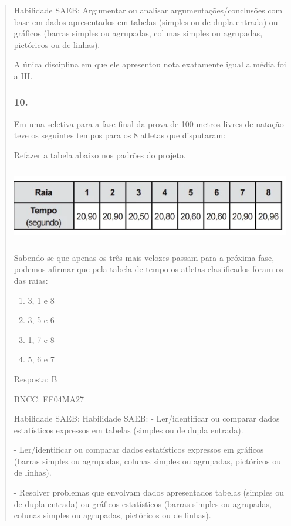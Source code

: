 \begin{enumerate}
\begin{escolha}
\begin{enumerate}
\begin{itemize}
\begin{itemize}
\begin{escolha}
\begin{quote}
\begin{escolha}
{Habilidade SAEB: Argumentar ou analisar argumentações/conclusões com
base em dados apresentados em tabelas (simples ou de dupla entrada) ou
gráficos (barras simples ou agrupadas, colunas simples ou agrupadas,
pictóricos ou de linhas).

A única disciplina em que ele apresentou nota exatamente igual a média
foi a III.

\subsubsection{10.}\label{section-181}

Em uma seletiva para a fase final da prova de 100 metros livres de
natação teve os seguintes tempos para os 8 atletas que disputaram:

Refazer a tabela abaixo nos padrões do projeto.

\includegraphics[width=5.90556in,height=1.27708in]{media/image161.png}

Sabendo-se que apenas os três mais velozes passam para a próxima fase,
podemos afirmar que pela tabela de tempo os atletas clasiificados foram
os das raias:

\begin{enumerate}
\def\labelenumi{\alph{enumi})}
\item
  3, 1 e 8
\item
  3, 5 e 6
\item
  1, 7 e 8
\item
  5, 6 e 7
\end{enumerate}

Resposta: B

BNCC: EF04MA27

Habilidade SAEB: Habilidade SAEB: - Ler/identificar ou comparar dados
estatísticos expressos em tabelas (simples ou de dupla entrada).

- Ler/identificar ou comparar dados estatísticos expressos em gráficos
(barras simples ou agrupadas, colunas simples ou agrupadas, pictóricos
ou de linhas).

- Resolver problemas que envolvam dados apresentados tabelas (simples ou
de dupla entrada) ou gráficos estatísticos (barras simples ou agrupadas,
colunas simples ou agrupadas, pictóricos ou de linhas).

}
\end{escolha}
\end{quote}
\end{escolha}
\end{itemize}
\end{itemize}
\end{enumerate}
\end{escolha}
\end{enumerate}
